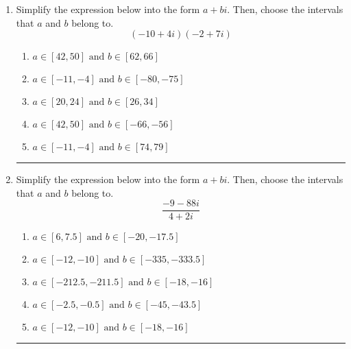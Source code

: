 \documentclass[14pt]{extbook}
\newcommand{\litem}[1]{\item#1\hspace*{-1cm}\rule{\textwidth}{0.4pt}}
\begin{document}
\begin{enumerate}
{\begin{enumerate}[label=\Alph*.]
\end{enumerate} }
\litem{
Simplify the expression below into the form $a+bi$. Then, choose the intervals that $a$ and $b$ belong to.\[ (-10 + 4 i)(-2 + 7 i) \]\begin{enumerate}[label=\Alph*.]
\item \( a \in [42, 50] \text{ and } b \in [62, 66] \)
\item \( a \in [-11, -4] \text{ and } b \in [-80, -75] \)
\item \( a \in [20, 24] \text{ and } b \in [26, 34] \)
\item \( a \in [42, 50] \text{ and } b \in [-66, -56] \)
\item \( a \in [-11, -4] \text{ and } b \in [74, 79] \)

\end{enumerate} }
\litem{
Simplify the expression below into the form $a+bi$. Then, choose the intervals that $a$ and $b$ belong to.\[ \frac{-9 - 88 i}{4 + 2 i} \]\begin{enumerate}[label=\Alph*.]
\item \( a \in [6, 7.5] \text{ and } b \in [-20, -17.5] \)
\item \( a \in [-12, -10] \text{ and } b \in [-335, -333.5] \)
\item \( a \in [-212.5, -211.5] \text{ and } b \in [-18, -16] \)
\item \( a \in [-2.5, -0.5] \text{ and } b \in [-45, -43.5] \)
\item \( a \in [-12, -10] \text{ and } b \in [-18, -16] \)

\end{enumerate} }
\end{enumerate}
\end{document}
